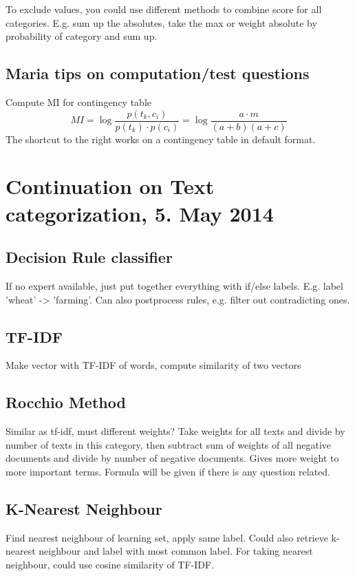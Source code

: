 \documentclass[11pt]{article}
\begin{document}
To exclude values, you could use different methods to combine score for all categories. E.g. sum up the absolutes, take the max or weight absolute by probability of category and sum up.

\subsection{Maria tips on computation/test questions}
Compute MI for contingency table
\begin{equation}
	MI = \log \frac{p(t_k, c_i)}{p(t_k)\cdot p(c_i)} = \log \frac{a \cdot m}{(a + b) (a + c)}
\end{equation}
The shortcut to the right works on a contingency table in default format. 

\section{Continuation on Text categorization, 5. May 2014}
\subsection{Decision Rule classifier}
If no expert available, just put together everything with if/else labels. E.g. label 'wheat' -> 'farming'. Can also postprocess rules, e.g. filter out contradicting ones. 

\subsection{TF-IDF }
Make vector with TF-IDF of words, compute similarity of two vectors

\subsection{Rocchio Method}
Similar as tf-idf, must different weights? Take weights for all texts and divide by number
of texts in this category, then subtract sum of weights of all negative documents and divide
by number of negative documents. Gives more weight to more important terms. Formula will be
given if there is any question related.

\subsection{K-Nearest Neighbour}
Find nearest neighbour of learning set, apply same label. Could also retrieve k-nearest
neighbour and label with most common label. For taking nearest neighbour, could use cosine
similarity of TF-IDF.
\end{document}
